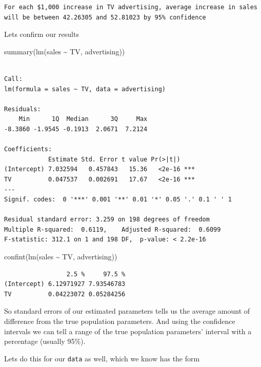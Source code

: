 \documentclass[
  letterpaper,
  DIV=11,
  numbers=noendperiod]{scrreprt}
\newenvironment{Shaded}{\begin{snugshade}}{\end{snugshade}}
\newcommand{\FunctionTok}[1]{\textcolor[rgb]{0.02,0.16,0.49}{#1}}
\newcommand{\NormalTok}[1]{\textcolor[rgb]{0.33,0.33,0.33}{#1}}
\newcommand{\SpecialCharTok}[1]{\textcolor[rgb]{0.00,0.46,0.62}{#1}}
\begin{document}
\begin{verbatim}
For each $1,000 increase in TV advertising, average increase in sales will be between 42.26305 and 52.81023 by 95% confidence
\end{verbatim}

Lets confirm our results

\begin{Shaded}
\begin{Highlighting}[]
\FunctionTok{summary}\NormalTok{(}\FunctionTok{lm}\NormalTok{(sales }\SpecialCharTok{\textasciitilde{}}\NormalTok{ TV, advertising))}
\end{Highlighting}
\end{Shaded}

\begin{verbatim}

Call:
lm(formula = sales ~ TV, data = advertising)

Residuals:
    Min      1Q  Median      3Q     Max 
-8.3860 -1.9545 -0.1913  2.0671  7.2124 

Coefficients:
            Estimate Std. Error t value Pr(>|t|)    
(Intercept) 7.032594   0.457843   15.36   <2e-16 ***
TV          0.047537   0.002691   17.67   <2e-16 ***
---
Signif. codes:  0 '***' 0.001 '**' 0.01 '*' 0.05 '.' 0.1 ' ' 1

Residual standard error: 3.259 on 198 degrees of freedom
Multiple R-squared:  0.6119,    Adjusted R-squared:  0.6099 
F-statistic: 312.1 on 1 and 198 DF,  p-value: < 2.2e-16
\end{verbatim}

\begin{Shaded}
\begin{Highlighting}[]
\FunctionTok{confint}\NormalTok{(}\FunctionTok{lm}\NormalTok{(sales }\SpecialCharTok{\textasciitilde{}}\NormalTok{ TV, advertising))}
\end{Highlighting}
\end{Shaded}

\begin{verbatim}
                 2.5 %     97.5 %
(Intercept) 6.12971927 7.93546783
TV          0.04223072 0.05284256
\end{verbatim}

So standard errors of our estimated parameters tells us the average
amount of difference from the true population parameters. And using the
confidence intervals we can tell a range of the true population
parameters' interval with a percentage (usually 95\%).

Lets do this for our \texttt{data} as well, which we know has the form
\end{document}
